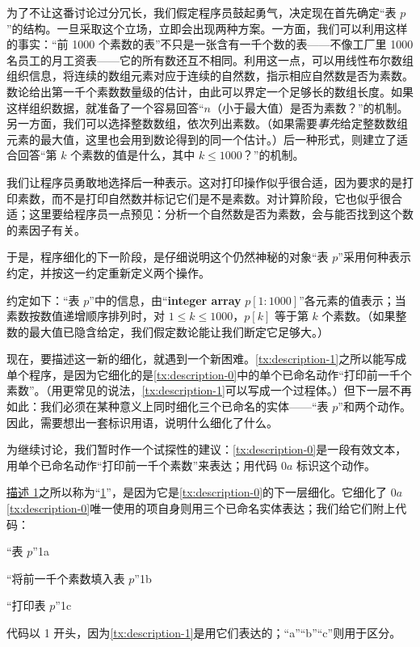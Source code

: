 为了不让这番讨论过分冗长，我们假定程序员鼓起勇气，决定现在首先确定“表 $p$”的结构。一旦采取这个立场，立即会出现两种方案。一方面，我们可以利用这样的事实：“前 1000 个素数的表”不只是一张含有一千个数的表——不像工厂里 1000 名员工的月工资表——它的所有数还互不相同。利用这一点，可以用线性布尔数组组织信息，将连续的数组元素对应于连续的自然数，指示相应自然数是否为素数。数论给出第一千个素数数量级的估计，由此可以界定一个足够长的数组长度。如果这样组织数据，就准备了一个容易回答“$n$（小于最大值）是否为素数？”的机制。另一方面，我们可以选择整数数组，依次列出素数。（如果需要\textit{事先}给定整数数组元素的最大值，这里也会用到数论得到的同一个估计。）后一种形式，则建立了适合回答“第 $k$ 个素数的值是什么，其中 $k \leqslant 1000$？”的机制。

我们让程序员勇敢地选择后一种表示。这对打印操作似乎很合适，因为要求的是打印素数，而不是打印自然数并标记它们是不是素数。对计算阶段，它也似乎很合适；这里要给程序员一点预见：分析一个自然数是否为素数，会与能否找到这个数的素因子有关。

于是，程序细化的下一阶段，是仔细说明这个仍然神秘的对象“表 $p$”采用何种表示约定，并按这一约定重新定义两个操作。

约定如下：“表 $p$”中的信息，由“\textbf{integer array} $p[1 : 1000]$”各元素的值表示；当素数按数值递增顺序排列时，对 $1 \leqslant k \leqslant 1000$，$p[k]$ 等于第 $k$ 个素数。（如果整数的最大值已隐含给定，我们假定数论能让我们断定它足够大。）

现在，要描述这一新的细化，就遇到一个新困难。\ref{tx:description-1}之所以能写成单个程序，是因为它细化的是\ref{tx:description-0}中的单个已命名动作“打印前一千个素数”。（用更常见的说法，\ref{tx:description-1}可以写成一个过程体。）但下一层不再如此：我们必须在某种意义上同时细化三个已命名的实体——“表 $p$”和两个动作。因此，需要想出一套标识用语，说明什么细化了什么。

为继续讨论，我们暂时作一个试探性的建议：\ref{tx:description-0}是一段有效文本，用单个已命名动作“打印前一千个素数”来表达；用代码 $0a$ 标识这个动作。

\hyperref[tx:description-1]{描述 1}之所以称为“\hyperref[tx:description-1]{1}”，是因为它是\ref{tx:description-0}的下一层细化。它细化了 $0a$\textemdash{}\ref{tx:description-0}唯一使用的项\textemdash{}自身则用三个已命名实体表达；我们给它们附上代码：

\noindent
“表 $p$”\hfill 1a

\noindent
“将前一千个素数填入表 $p$”\hfill 1b

\noindent
“打印表 $p$”\hfill 1c

\noindent
代码以 1 开头，因为\ref{tx:description-1}是用它们表达的；“a”“b”“c”则用于区分。

